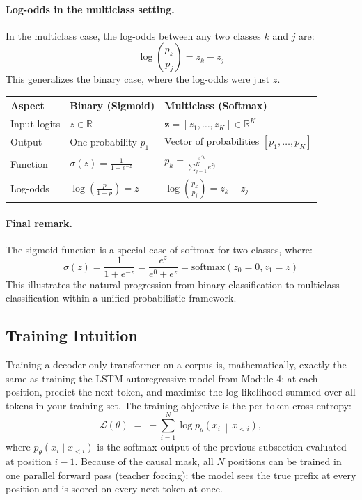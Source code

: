 \documentclass[11pt]{article}
\theoremstyle{remark}
\begin{document}
\paragraph{Log-odds in the multiclass setting.}
In the multiclass case, the log-odds between any two classes \( k \) and \( j \) are:
\begin{equation}
\log\left( \frac{p_k}{p_j} \right) = z_k - z_j
\end{equation}
This generalizes the binary case, where the log-odds were just \( z \).

\begin{center}
\renewcommand{\arraystretch}{1.3}
\begin{tabular}{@{}lll@{}}
\toprule
\textbf{Aspect} & \textbf{Binary (Sigmoid)} & \textbf{Multiclass (Softmax)} \\
\midrule
Input logits & \( z \in \mathbb{R} \) & \( \mathbf{z} = [z_1, \dots, z_K] \in \mathbb{R}^K \) \\
Output & One probability \( p_1 \) & Vector of probabilities \( [p_1, \dots, p_K] \) \\
Function & \( \sigma(z) = \frac{1}{1 + e^{-z}} \) & \( p_k = \frac{e^{z_k}}{\sum_{j=1}^{K} e^{z_j}} \) \\
Log-odds & \( \log\left( \frac{p}{1-p} \right) = z \) & \( \log\left( \frac{p_k}{p_j} \right) = z_k - z_j \) \\
\bottomrule
\end{tabular}
\end{center}

\paragraph{Final remark.}
The sigmoid function is a special case of softmax for two classes, where:
\begin{equation}
\sigma(z) = \frac{1}{1 + e^{-z}} = \frac{e^z}{e^0 + e^z} = \text{softmax}(z_0 = 0, z_1 = z)
\end{equation}
This illustrates the natural progression from binary classification to multiclass classification within a unified probabilistic framework.

\subsection{Training Intuition}

Training a decoder-only transformer on a corpus is, mathematically, exactly the same as training the LSTM autoregressive model from Module 4: at each position, predict the next token, and maximize the log-likelihood summed over all tokens in your training set. The training objective is the per-token cross-entropy:
\[
\mathcal{L}(\theta) \;=\; -\sum_{i=1}^{N} \log p_\theta\!\left(x_i \,\middle|\, x_{<i}\right),
\]
where \(p_\theta(x_i \mid x_{<i})\) is the softmax output of the previous subsection evaluated at position \(i-1\). Because of the causal mask, all \(N\) positions can be trained in one parallel forward pass (teacher forcing): the model sees the true prefix at every position and is scored on every next token at once.
\end{document}
